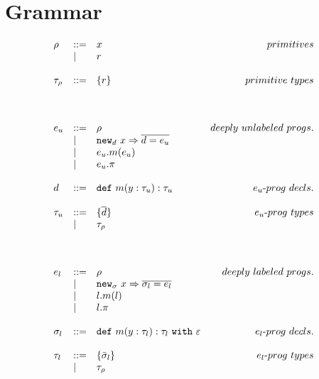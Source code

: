 \documentclass{llncs}
\newcommand{\keywadj}[1]{\mathtt{#1}}
\newcommand{\keyw}[1]{\keywadj{#1}~}
\newcommand{\kw}[1]{\keyw{ #1 }}
\newcommand{\kwa}[1]{\keywadj{ #1 }}
\newcommand{\hyphen}{\hbox{-}}
\begin{document}
\section{Grammar}

\[
\begin{array}{lll}

\begin{array}{lllr}

\rho & ::= & x & primitives\\
		& | & r \\
		&&\\
		
\tau_\rho & ::= & \{ r \} & primitive~types \\
		&&\\\\\\

e_u & ::= & \rho & deeply~unlabeled~progs. \\
 		& | & \kwa{new}_d~x \Rightarrow \overline{d = e_u} \\
 		& | & e_u.m(e_u)\\
 		& | & e_u.\pi\\
		&&\\

d & ::= & \kw{def} m(y:\tau_u):\tau_u & e_u \hyphen prog~decls.\\
		&&\\

\tau_u & ::= & \{ \overline{ d } \} & e_u \hyphen prog~types \\
	& | & \tau_\rho \\
	&&\\\\\\





e_l & ::= & \rho & deeply~labeled~progs. \\
	& | & \kwa{new}_\sigma~x \Rightarrow \overline{\sigma_l = e_l} \\
	& | & l.m(l) \\
	& | & l.\pi \\
	&&\\

\sigma_l & ::= & \kwa{def}~m(y : \tau_l) : \tau_l~\kw{with} \varepsilon & e_l \hyphen prog~decls. \\
	&&\\

\tau_l & ::= & \{ \bar \sigma_l \} & e_l \hyphen prog~types \\
	& | & \tau_\rho \\
	&&\\\\\\
	

\end{array}
\end{array}\]
\end{document}
